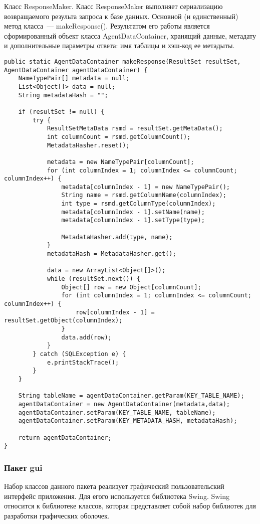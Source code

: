 Класс ResponseMaker. Класс ResponseMaker выполняет сериализацию возвращаемого результа запроса к базе данных. Основной (и единственный) метод класса~--- makeResponse(). Результатом его работы является сформированный объект класса AgentDataContainer, хранящий данные, метадату и дополнительные параметры ответа: имя таблицы и хэш-код ее метадыты.
\begin{lstlisting}
public static AgentDataContainer makeResponse(ResultSet resultSet, AgentDataContainer agentDataContainer) {
    NameTypePair[] metadata = null;
    List<Object[]> data = null;
    String metadataHash = "";

    if (resultSet != null) {
        try {
            ResultSetMetaData rsmd = resultSet.getMetaData();
            int columnCount = rsmd.getColumnCount();
            MetadataHasher.reset();

            metadata = new NameTypePair[columnCount];
            for (int columnIndex = 1; columnIndex <= columnCount; columnIndex++) {
                metadata[columnIndex - 1] = new NameTypePair();
                String name = rsmd.getColumnName(columnIndex);
                int type = rsmd.getColumnType(columnIndex);
                metadata[columnIndex - 1].setName(name);
                metadata[columnIndex - 1].setType(type);

                MetadataHasher.add(type, name);
            }
            metadataHash = MetadataHasher.get();

            data = new ArrayList<Object[]>();
            while (resultSet.next()) {
                Object[] row = new Object[columnCount];
                for (int columnIndex = 1; columnIndex <= columnCount; columnIndex++) {
                    row[columnIndex - 1] = resultSet.getObject(columnIndex);
                }
                data.add(row);
            }
        } catch (SQLException e) {
            e.printStackTrace();
        }
    }

    String tableName = agentDataContainer.getParam(KEY_TABLE_NAME);
    agentDataContainer = new AgentDataContainer(metadata,data);
    agentDataContainer.setParam(KEY_TABLE_NAME, tableName);
    agentDataContainer.setParam(KEY_METADATA_HASH, metadataHash);

    return agentDataContainer;
}
\end{lstlisting}

\subsubsection{Пакет gui}
Набор классов данного пакета реализует графический пользовательский интерфейс приложения. Для егого используется библиотека Swing. Swing относится к библиотеке классов, которая представляет собой набор библиотек для разработки графических оболочек.

